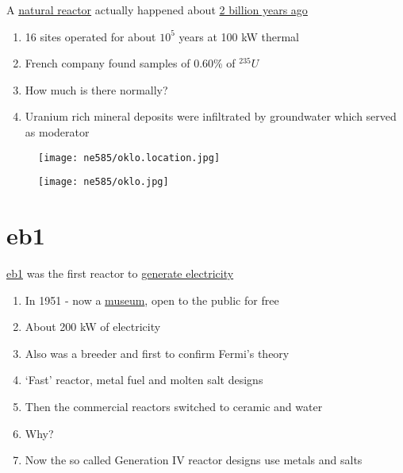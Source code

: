 \documentclass[aspectratio=1610,pdftex,dvipsnames,compress,xcolor={dvipsnames}]{beamer}
\newcommand{\acs}{\acrshort} %
\begin{document}
\addtocounter{framenumber}{-1} 
\begin{frame}{A \href{https://uidaho.pressbooks.pub/nuclearengineering/chapter/nuclear-fuel-cycle-system/}{natural reactor} actually happened about \href{https://uidaho.pressbooks.pub/nuclearengineering/chapter/neutronics/}{2 billion years ago}}
    \begin{enumerate}[series=outerlist,topsep=0pt,itemsep=21pt,leftmargin=*,label=(\arabic*)]
        \item[]16 sites operated for about $10^5$ years at 100 kW thermal
        \item[]French company found samples of 0.60\% of $^{235}U$
        \item[]How much is there normally?
        \item[]Uranium rich mineral deposits were infiltrated by groundwater which served as moderator
    \end{enumerate}
\end{frame}


\begin{frame}{}
    \begin{figure}
        \centering
        \texttt{[image: ne585/oklo.location.jpg]}
    \end{figure}
\end{frame}


\begin{frame}{}
    \begin{figure}
        \centering
        \texttt{[image: ne585/oklo.jpg]}
    \end{figure}
\end{frame}


\section{\acs{eb1}}


\addtocounter{framenumber}{-1} 
\begin{frame}{\href{https://uidaho.pressbooks.pub/nuclearengineering/chapter/nuclear-fuel-cycle-system/}{\acs{eb1}} was the first reactor to \href{https://uidaho.pressbooks.pub/nuclearengineering/chapter/fuel-cycle-analysis/}{generate electricity}}
    \begin{enumerate}[series=outerlist,topsep=0pt,itemsep=21pt,leftmargin=*,label=(\arabic*)]
        \item[]In 1951 - now a \href{https://inl.gov/experimental-breeder-reactor-i/}{museum}, open to the public for free
        \item[]About 200 kW of electricity
        \item[]Also was a breeder and first to confirm Fermi’s theory
        \item[]`Fast' reactor, metal fuel and molten salt designs
        \item[]Then the commercial reactors switched to ceramic and water
        \item[]Why?
        \item[]Now the so called Generation IV reactor designs use metals and salts 
    \end{enumerate}
\end{frame}
\end{document}
